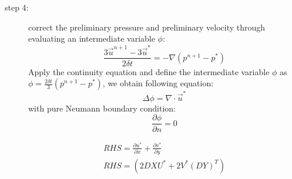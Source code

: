 \documentclass[12pt]{article}
\begin{document}
\begin{description}
\item[step 4:] correct the preliminary pressure and preliminary velocity through 
evaluating an intermediate variable $\phi$:\\

\begin{equation}
\frac{3\vec{u}^{n+1}-3\vec{u}^{*}}{2\delta t} = -\nabla (p^{n+1}-{p}^{*})
\end{equation}
Apply the continuity equation and define the intermediate variable $\phi$ as $\phi 
= \frac{2\delta t}{3}(p^{n+1}-{p}^{*})$, we obtain following equation:\\
\begin{equation}
\Delta \phi = \nabla \cdot \vec{u}^{*}
\end{equation}
with pure Neumann boundary condition:\\

\begin{equation}
\frac{\partial \phi}{\partial n} =0
\end{equation}

\begin{align}
RHS = \frac{\partial u^{*}}{\partial x} + \frac{\partial v^{*}}{\partial y}\\
RHS = (2DXU^{*} + 2V^{*}(DY)^{T})
\end{align}


\end{description}
\end{document}
